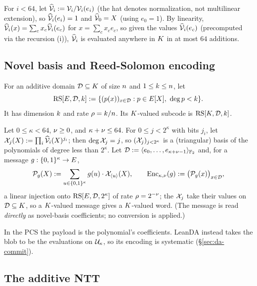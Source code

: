 For $i<64$, let $\widehat{\mathcal{V}}_{i} := \mathcal{V}_i / \mathcal{V}_i(e_i)$ (the hat denotes normalization, not multilinear extension), so $\widehat{\mathcal{V}}_{i}(e_i) = 1$ and $\widehat{\mathcal{V}}_{0} = X$ (using $e_0 = 1$). By linearity, $\widehat{\mathcal{V}}_{i}(x) = \sum_c x_c \widehat{\mathcal{V}}_{i}(e_c)$ for $x = \sum_c x_c e_c$, so given the values $\widehat{\mathcal{V}}_{i}(e_c)$ (precomputed via the recursion (i)), $\widehat{\mathcal{V}}_{i}$ is evaluated anywhere in $K$ in at most $64$ additions.

\subsection{Novel basis and Reed-Solomon encoding}\label{sec:ntt-encoding}

\begin{definition}\label{def:rs-code}
For an additive domain $\mathcal{D}\subseteq K$ of size $n$ and $1\le k\le n$, let
\[
  \mathrm{RS}[E,\mathcal{D},k]
  :=\{(p(x))_{x\in\mathcal{D}}:p\in E[X],\ \deg p<k\}.
\]
It has dimension $k$ and rate $\rho=k/n$. Its $K$-valued subcode is $\mathrm{RS}[K,\mathcal{D},k]$.
\end{definition}

\begin{definition}\label{def:enc}
Let $0\le\kappa<64$, $\nu\ge0$, and $\kappa+\nu\le64$. For $0 \le j < 2^{\kappa}$ with bits $j_i$, let $\mathcal{X}_j(X) := \prod_i \widehat{\mathcal{V}}_{i}(X)^{j_i}$; then $\deg \mathcal{X}_j = j$, so $(\mathcal{X}_j)_{j < 2^\kappa}$ is a (triangular) basis of the polynomials of degree less than $2^{\kappa}$. Let $\mathcal{D} := \langle e_0, \dots, e_{\kappa+\nu-1} \rangle_{\mathbb{F}_2}$ and, for a message $g : \{0,1\}^{\kappa} \to E$,
\[
\mathcal{P}_g(X) := \sum_{u \in \{0,1\}^{\kappa}} g(u) \cdot \mathcal{X}_{\langle u \rangle}(X), \qquad \mathrm{Enc}_{\kappa,\nu}(g) := \bigl(\mathcal{P}_g(x)\bigr)_{x \in \mathcal{D}},
\]
a linear injection onto $\mathrm{RS}[E, \mathcal{D}, 2^{\kappa}]$ of rate $\rho = 2^{-\nu}$; the $\mathcal{X}_j$ take their values on $\mathcal{D} \subseteq K$, so a $K$-valued message gives a $K$-valued word. (The message is read \emph{directly} as novel-basis coefficients; no conversion is applied.)
\end{definition}

In the PCS the payload is the polynomial's coefficients. LeanDA instead takes the blob to be the evaluations on $\mathcal{U}_\kappa$, so its encoding is systematic (\S\ref{sec:da-commit}).

\subsection{The additive NTT}\label{sec:ntt}

